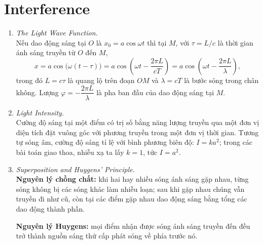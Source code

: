 \section{Interference}
\begin{enumerate}
\item \textit{The Light Wave Function.}\\
Nếu dao động sáng tại $O$ là $x_0 = a\cos\omega t$ thì tại $M$, với $\tau = L/c$ là thời gian ánh sáng truyền từ $O$ đến $M$,
\[
x = a\cos\big(\omega(t - \tau)\big) = a\cos\left(\omega t - \frac{2\pi L}{cT}\right) = a\cos\left(\omega t - \frac{2\pi L}{\lambda}\right),
\]
trong đó $L = c\tau$ là quang lộ trên đoạn $OM$ và $\lambda = cT$ là bước sóng trong chân không. Lượng $\varphi = -\dfrac{2\pi L}{\lambda}$ là pha ban đầu của dao động sáng tại $M$.

\item \textit{Light Intensity.}\\
Cường độ sáng tại một điểm có trị số bằng năng lượng truyền qua một đơn vị diện tích đặt vuông góc với phương truyền trong một đơn vị thời gian. Tương tự sóng âm, cường độ sáng tỉ lệ với bình phương biên độ: $I = k a^2$; trong các bài toán giao thoa, nhiễu xạ ta lấy $k = 1$, tức $I = a^2$.

\item \textit{Superposition and Huygens' Principle.}\\
\textbf{Nguyên lý chồng chất:} khi hai hay nhiều sóng ánh sáng gặp nhau, từng sóng không bị các sóng khác làm nhiễu loạn; sau khi gặp nhau chúng vẫn truyền đi như cũ, còn tại các điểm gặp nhau dao động sáng bằng tổng các dao động thành phần.

\textbf{Nguyên lý Huygens:} mọi điểm nhận được sóng ánh sáng truyền đến đều trở thành nguồn sáng thứ cấp phát sóng về phía trước nó.


\end{enumerate}

